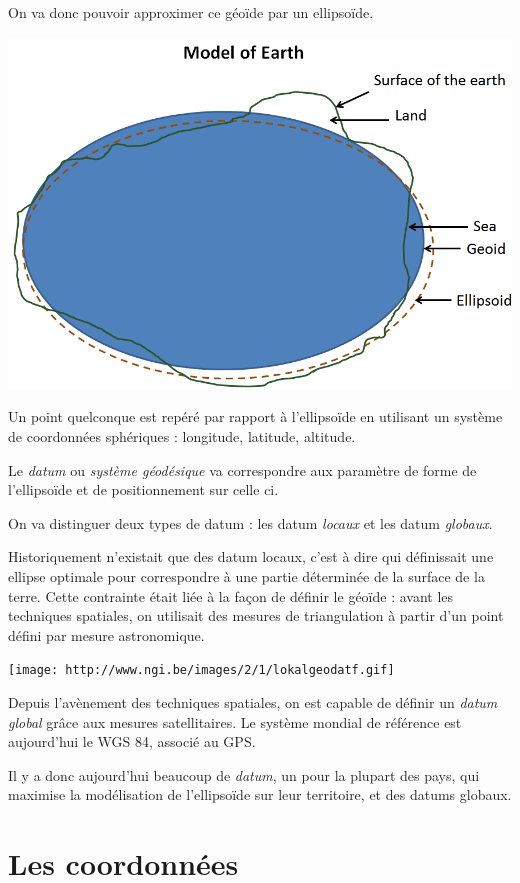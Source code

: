 \documentclass[
]{book}
\begin{document}
On va donc pouvoir approximer ce géoïde par un ellipsoïde.

\includegraphics{pic/datum.png}

Un point quelconque est repéré par rapport à l'ellipsoïde en utilisant un système de coordonnées sphériques : longitude, latitude, altitude.

Le \emph{datum} ou \emph{système géodésique} va correspondre aux paramètre de forme de l'ellipsoïde et de positionnement sur celle ci.

On va distinguer deux types de datum : les datum \emph{locaux} et les datum \emph{globaux}.

Historiquement n'existait que des datum locaux, c'est à dire qui définissait une ellipse optimale pour correspondre à une partie déterminée de la surface de la terre. Cette contrainte était liée à la façon de définir le géoïde : avant les techniques spatiales, on utilisait des mesures de triangulation à partir d'un point défini par mesure astronomique.

\texttt{[image: http://www.ngi.be/images/2/1/lokalgeodatf.gif]}

Depuis l'avènement des techniques spatiales, on est capable de définir un \emph{datum global} grâce aux mesures satellitaires. Le système mondial de référence est aujourd'hui le WGS 84, associé au GPS.

Il y a donc aujourd'hui beaucoup de \emph{datum}, un pour la plupart des pays, qui maximise la modélisation de l'ellipsoïde sur leur territoire, et des datums globaux.

\hypertarget{les-coordonnuxe9es}{%
\section{Les coordonnées}\label{les-coordonnuxe9es}}
\end{document}
